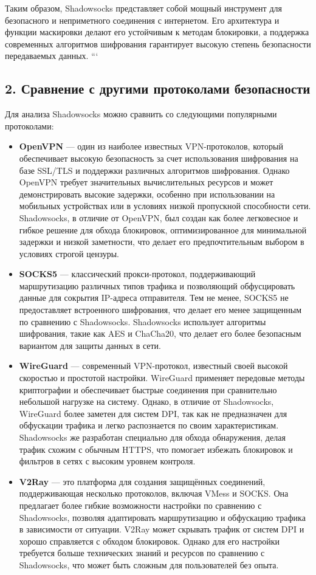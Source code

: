 \documentclass[a4paper,12pt]{article}
\begin{document}
Таким образом, Shadowsocks представляет собой мощный инструмент для безопасного и неприметного соединения с интернетом. Его архитектура и функции маскировки делают его устойчивым к методам блокировки, а поддержка современных алгоритмов шифрования гарантирует высокую степень безопасности передаваемых данных.
```
\subsection*{2. Сравнение с другими протоколами безопасности}

Для анализа Shadowsocks можно сравнить со следующими популярными протоколами:

\begin{itemize}
    \item \textbf{OpenVPN} --- один из наиболее известных VPN-протоколов, который обеспечивает высокую безопасность за счет использования шифрования на базе SSL/TLS и поддержки различных алгоритмов шифрования. Однако OpenVPN требует значительных вычислительных ресурсов и может демонстрировать высокие задержки, особенно при использовании на мобильных устройствах или в условиях низкой пропускной способности сети. Shadowsocks, в отличие от OpenVPN, был создан как более легковесное и гибкое решение для обхода блокировок, оптимизированное для минимальной задержки и низкой заметности, что делает его предпочтительным выбором в условиях строгой цензуры.

    \item \textbf{SOCKS5} --- классический прокси-протокол, поддерживающий маршрутизацию различных типов трафика и позволяющий обфусцировать данные для сокрытия IP-адреса отправителя. Тем не менее, SOCKS5 не предоставляет встроенного шифрования, что делает его менее защищенным по сравнению с Shadowsocks. Shadowsocks использует алгоритмы шифрования, такие как AES и ChaCha20, что делает его более безопасным вариантом для защиты данных в сети.

    \item \textbf{WireGuard} --- современный VPN-протокол, известный своей высокой скоростью и простотой настройки. WireGuard применяет передовые методы криптографии и обеспечивает быстрые соединения при сравнительно небольшой нагрузке на систему. Однако, в отличие от Shadowsocks, WireGuard более заметен для систем DPI, так как не предназначен для обфускации трафика и легко распознается по своим характеристикам. Shadowsocks же разработан специально для обхода обнаружения, делая трафик схожим с обычным HTTPS, что помогает избежать блокировок и фильтров в сетях с высоким уровнем контроля.

    \item \textbf{V2Ray} --- это платформа для создания защищённых соединений, поддерживающая несколько протоколов, включая VMess и SOCKS. Она предлагает более гибкие возможности настройки по сравнению с Shadowsocks, позволяя адаптировать маршрутизацию и обфускацию трафика в зависимости от ситуации. V2Ray может скрывать трафик от систем DPI и хорошо справляется с обходом блокировок. Однако для его настройки требуется больше технических знаний и ресурсов по сравнению с Shadowsocks, что может быть сложным для пользователей без опыта.
\end{itemize}
\end{document}
